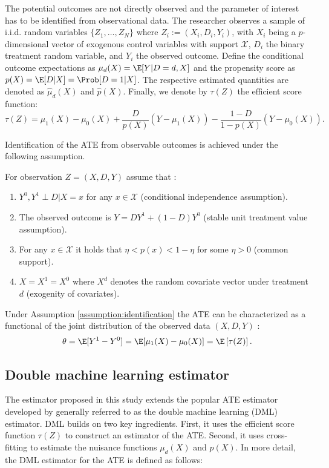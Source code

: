 The potential outcomes are not directly observed and the parameter of interest has to be identified from observational data. The researcher observes a sample of i.i.d. random variables $\{Z_1, \dots, Z_N\}$ where $Z_i := \left(X_i, D_i, Y_i\right)$, with $X_i$ being a $p$-dimensional vector of exogenous control variables with support $\mathcal{X}$, $D_i$ the binary treatment random variable, and $Y_i$ the observed outcome.  Define the conditional outcome expectations as $\mu_d(X) = \E[Y\vert D=d, X]$ and the propensity score as $p(X) = \E[D|X] = \Prob[D=1|X]$.
The respective estimated quantities are denoted as $\widehat{\mu}_d(X)$ and $\widehat{p}(X)$. Finally, we denote by $\tau(Z)$ the efficient score function:
\begin{equation*}
    \tau(Z) =  \mu_1(X) - \mu_0(X) + \frac{D}{p(X)}(Y-\mu_1(X)) - \frac{1-D}{1-p(X)}(Y-\mu_0(X)).
\end{equation*}

Identification of the ATE from observable outcomes is achieved under the following assumption.
\begin{assumption}[Identification]\label{assumption:identification} For observation $Z = \left(X, D, Y\right)$ assume that \citep{Rosenbaum1983}:
    \begin{enumerate}[label=(\roman*)]
        \item $Y^0, Y^1 \perp D \vert X = x $ for any $x \in \mathcal{X}$ (conditional independence assumption).
        \item The observed outcome is $Y = D Y^1 + (1-D) Y^0$ (stable unit treatment value assumption).
        \item For any $x \in \mathcal{X}$ it holds that $\eta < p(x) < 1-\eta$ for some $\eta>0$ (common support).
        \item $X = X^1 = X^0$ where $X^d$ denotes the random covariate vector under treatment $d$ (exogenity of covariates).
    \end{enumerate}
\end{assumption}
Under Assumption \ref{assumption:identification} the ATE can be characterized as a functional of the joint distribution of the observed data $(X,D,Y)$ \citep{Athey2019}:
\begin{align}\label{eq:dr}
    \theta = \E[Y^1 - Y^0] =  \E[\mu_1(X) - \mu_0(X)] = \E\left[ \tau(Z) \right].
\end{align}
 
\subsection{Double machine learning estimator}
The estimator proposed in this study extends the popular ATE estimator developed by \cite{Chernozhukov2018} generally referred to as the double machine learning (DML) estimator. DML builds on two key ingredients. First, it uses the efficient score function $\tau(Z)$ to construct an estimator of the ATE. Second, it uses cross-fitting to estimate the nuisance functions $\mu_d(X)$ and $p(X)$. In more detail, the DML estimator for the ATE is defined as follows:


